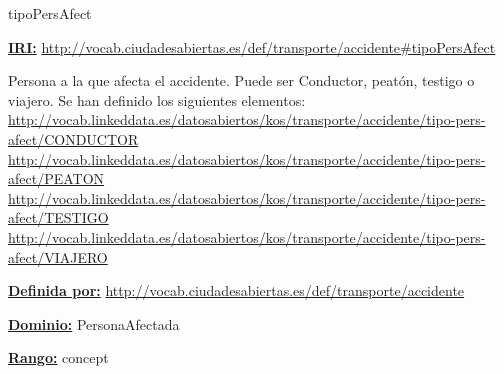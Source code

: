 \begin{mybox}{tipoPersAfect}
\begin{flushleft}
\underline{\textbf{IRI:}}
\url{http://vocab.ciudadesabiertas.es/def/transporte/accidente#tipoPersAfect}
\newline

Persona a la que afecta el accidente. Puede ser Conductor, peatón, testigo o viajero. Se han definido los siguientes elementos:
\newline \url{http://vocab.linkeddata.es/datosabiertos/kos/transporte/accidente/tipo-pers-afect/CONDUCTOR}
\newline \url{http://vocab.linkeddata.es/datosabiertos/kos/transporte/accidente/tipo-pers-afect/PEATON}
\newline \url{http://vocab.linkeddata.es/datosabiertos/kos/transporte/accidente/tipo-pers-afect/TESTIGO}
\newline \url{http://vocab.linkeddata.es/datosabiertos/kos/transporte/accidente/tipo-pers-afect/VIAJERO}
\newline

\underline{\textbf{Definida por:}}\newline
\url{http://vocab.ciudadesabiertas.es/def/transporte/accidente}
\newline

\underline{\textbf{Dominio:}} PersonaAfectada
\newline

\underline{\textbf{Rango:}} concept
\newline

\end{flushleft}
\end{mybox}














